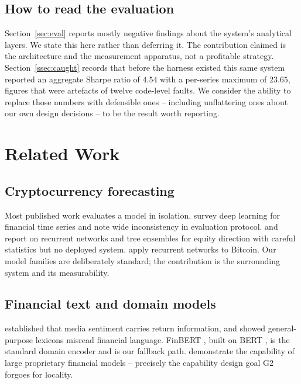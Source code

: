\documentclass[preprint,12pt,authoryear]{elsarticle}
\begin{document}
\subsection{How to read the evaluation}

Section~\ref{sec:eval} reports mostly negative findings about the system's
analytical layers. We state this here rather than deferring it. The contribution
claimed is the architecture and the measurement apparatus, not a profitable
strategy. Section~\ref{ssec:caught} records that before the harness existed this
same system reported an aggregate Sharpe ratio of $4.54$ with a per-series
maximum of $23.65$, figures that were artefacts of twelve code-level faults. We
consider the ability to replace those numbers with defensible ones -- including
unflattering ones about our own design decisions -- to be the result worth
reporting.

\section{Related Work}
\label{sec:related}

\subsection{Cryptocurrency forecasting}

Most published work evaluates a model in isolation.
\citet{sezer2020financial} survey deep learning for financial time series and
note wide inconsistency in evaluation protocol. \citet{fischer2018deep} and
\citet{krauss2017deep} report on recurrent networks and tree ensembles for
equity direction with careful statistics but no deployed system.
\citet{mcnally2018predicting} apply recurrent networks to Bitcoin. Our model
families are deliberately standard; the contribution is the surrounding system
and its measurability.

\subsection{Financial text and domain models}

\citet{tetlock2007giving} established that media sentiment carries return
information, and \citet{loughran2011liability} showed general-purpose lexicons
misread financial language. FinBERT \citep{yang2020finbert}, built on BERT
\citep{devlin2019bert}, is the standard domain encoder and is our fallback path.
\citet{wu2023bloomberggpt} demonstrate the capability of large proprietary
financial models -- precisely the capability design goal G2 forgoes for locality.
\end{document}
